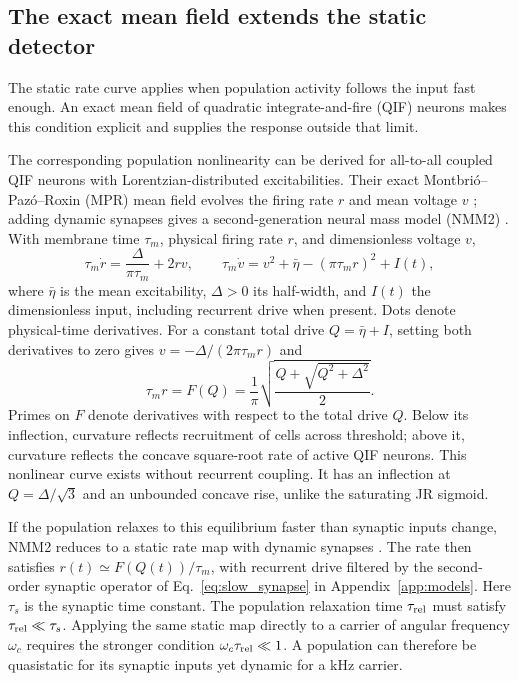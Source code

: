 \documentclass[11pt,a4paper]{article}
\begin{document}

\subsection{The exact mean field extends the static detector}\label{sec:dynamic}
The static rate curve applies when population activity follows the input fast
enough. An exact mean field of quadratic integrate-and-fire (QIF) neurons makes
this condition explicit and supplies the response outside that limit.

The corresponding population nonlinearity can be derived for all-to-all coupled
QIF neurons with Lorentzian-distributed excitabilities. Their exact
Montbri\'o--Paz\'o--Roxin (MPR) mean field evolves the firing rate $r$ and mean voltage
$v$ \cite{montbrio2015}; adding dynamic synapses gives a second-generation neural mass model (NMM2)
\cite{ruffini2021nmm2,clusella2023}. With membrane time $\tau_m$, physical firing rate $r$, and dimensionless voltage $v$,
\begin{equation}
\tau_m\dot r=\frac{\Delta}{\pi\tau_m}+2rv,\qquad
\tau_m\dot v=v^2+\bar\eta-(\pi\tau_m r)^2+I(t),
\label{eq:mpr}
\end{equation}
where $\bar\eta$ is the mean excitability, $\Delta>0$ its half-width, and $I(t)$ the
dimensionless input, including recurrent drive when present. Dots denote physical-time derivatives. For a constant total drive
$Q=\bar\eta+I$, setting both derivatives to zero gives $v=-\Delta/(2\pi\tau_m r)$ and
\begin{equation}
\tau_m r=F(Q)=\frac{1}{\pi}\sqrt{\frac{Q+\sqrt{Q^2+\Delta^2}}{2}} .
\label{eq:Fmpr}
\end{equation}
Primes on $F$ denote derivatives with respect to the total drive $Q$.
Below its inflection, curvature reflects recruitment of cells across threshold;
above it, curvature reflects the concave square-root rate of active QIF neurons. This nonlinear curve exists
without recurrent coupling. It has an inflection at
$Q=\Delta/\sqrt3$ and an unbounded concave rise, unlike the saturating JR sigmoid.

If the population relaxes to this equilibrium faster than synaptic inputs change,
NMM2 reduces to a static rate map with dynamic synapses
\cite{ruffini2021nmm2,clusella2023}. The rate then satisfies $r(t)\simeq F(Q(t))/\tau_m$, with recurrent drive
filtered by the second-order synaptic operator of Eq.~\eqref{eq:slow_synapse}
in Appendix~\ref{app:models}.
Here $\tau_s$ is the synaptic time constant. The population relaxation time
$\tau_{\rm rel}$ must satisfy $\tau_{\rm rel}\ll\tau_s$. Applying the same static map directly to a
carrier of angular frequency $\omega_c$ requires the stronger condition
$\omega_c\tau_{\rm rel}\ll1$. A population can therefore be quasistatic for its
synaptic inputs yet dynamic for a kHz carrier.
\end{document}
